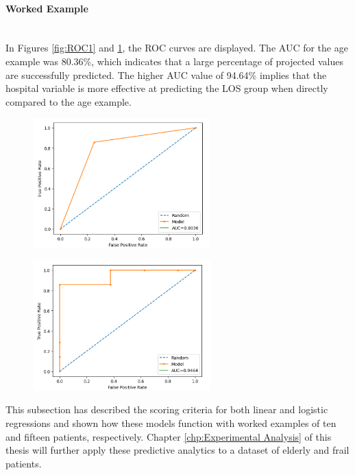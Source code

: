 \documentclass[../thesis.tex]{subfiles}
\begin{document}
\paragraph{Worked Example}\\
In Figures \ref{fig:ROC1} and \ref{fig:ROC2}, the ROC curves are displayed. The AUC for the age example was 80.36\%, which indicates that a large percentage of projected values are successfully predicted. The higher AUC value of 94.64\% implies that the hospital variable is more effective at predicting the LOS group when directly compared to the age example.


\begin{figure}
\centering
\begin{minipage}{.5\textwidth}
  \centering
  \includegraphics[height = 5cm]{Chapters/Chapter3New/Figures/ROCCurveExample.png}
  \label{fig:ROC1}
\end{minipage}%
\begin{minipage}{.5\textwidth}
  \centering
  \includegraphics[height = 5cm]{Chapters/Chapter3New/Figures/ROCCurveExample1.png}
  \label{fig:ROC2}
\end{minipage}
\end{figure}


This subsection has described the scoring criteria for both linear and logistic regressions and shown how these models function with worked examples of ten and fifteen patients, respectively. Chapter \ref{chp:Experimental Analysis} of this thesis will further apply these predictive analytics to a dataset of elderly and frail patients.
\end{document}
